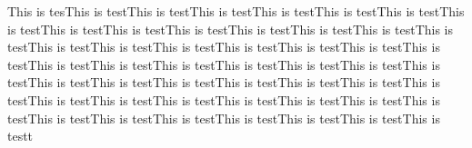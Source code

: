 
This is tesThis is testThis is testThis is testThis is testThis is testThis is testThis is testThis is testThis is testThis is testThis is testThis is testThis is testThis is testThis is testThis is testThis is testThis is testThis is testThis is testThis is testThis is testThis is testThis is testThis is testThis is testThis is testThis is testThis is testThis is testThis is testThis is testThis is testThis is testThis is testThis is testThis is testThis is testThis is testThis is testThis is testThis is testThis is testThis is testThis is testThis is testThis is testThis is testThis is testt

